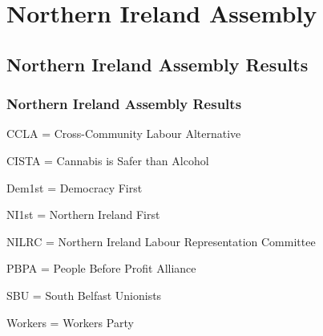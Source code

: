\part{Northern Ireland Assembly}

\chapter{Northern Ireland Assembly Results}

\section{Northern Ireland Assembly Results}

CCLA = Cross-Community Labour Alternative

CISTA = Cannabis is Safer than Alcohol

Dem1st = Democracy First

NI1st = Northern Ireland First

NILRC = Northern Ireland Labour Representation Committee

PBPA = People Before Profit Alliance

%
%
SBU = South Belfast Unionists

%
%
Workers = Workers Party

